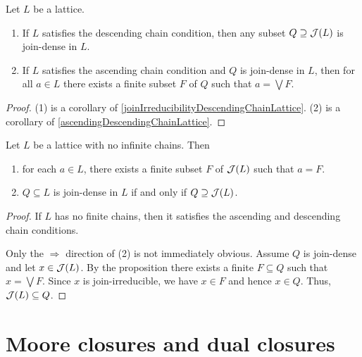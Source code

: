 \begin{proposition}
Let $L$ be a lattice.
\begin{enumerate}
\item If $L$ satisfies the descending chain condition, then any subset $Q\supseteq \operatorname{\mathcal{J}}(L)$ is join-dense in $L$.
\item If $L$ satisfies the ascending chain condition and $Q$ is join-dense in $L$, then for all $a\in L$ there exists a finite subset $F$ of $Q$ such that $a = \bigvee F$.
\end{enumerate}
\end{proposition}
\begin{proof}
(1) is a corollary of \ref{joinIrreducibilityDescendingChainLattice}. (2) is a corollary of \ref{ascendingDescendingChainLattice}.
\end{proof}
\begin{corollary}
Let $L$ be a lattice with no infinite chains. Then
\begin{enumerate}
\item for each $a \in L$, there exists a finite subset $F$ of $\operatorname{\mathcal{J}}(L)$ such that $a = F$.
\item $Q\subseteq L$ is join-dense in $L$ if and only if $Q \supseteq \operatorname{\mathcal{J}}(L)$.
\end{enumerate}
\end{corollary}
\begin{proof}
If $L$ has no finite chains, then it satisfies the ascending and descending chain conditions.

Only the $\Rightarrow$ direction of (2) is not immediately obvious. Assume $Q$ is join-dense and let $x\in \operatorname{\mathcal{J}}(L)$. By the proposition there exists a finite $F\subseteq Q$ such that $x = \bigvee F$. Since $x$ is join-irreducible, we have $x \in F$ and hence $x \in Q$. Thus, $\operatorname{\mathcal{J}}(L) \subseteq Q$.
\end{proof}

\section{Moore closures and dual closures}

